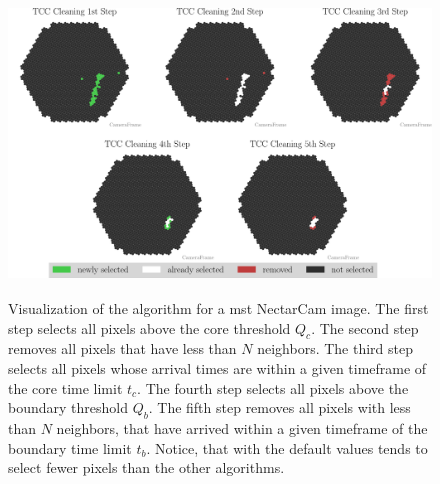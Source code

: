 \begin{figure}
    \centering
    \includegraphics[height=8cm]{plots/cleaner_steps/tcc.pdf}
    \caption{Visualization of the \tcc{} algorithm for a \gls{mst} NectarCam image. The first step
    selects all pixels above the core threshold \(Q_c\). The second step removes all pixels that have less than
    \(N\) neighbors. The third step selects all pixels whose arrival times are within a given timeframe of the
    core time limit \(t_c\). The fourth step selects all pixels above the boundary threshold \(Q_b\).
    The fifth step removes all pixels with less than \(N\) neighbors, that have arrived within a given timeframe
    of the boundary time limit \(t_b\). Notice, that with the default values \tcc{} tends to select fewer pixels
    than the other algorithms.}%
    \label{fig:tcc_cleaning}
\end{figure}
\vspace{-0.5cm}

